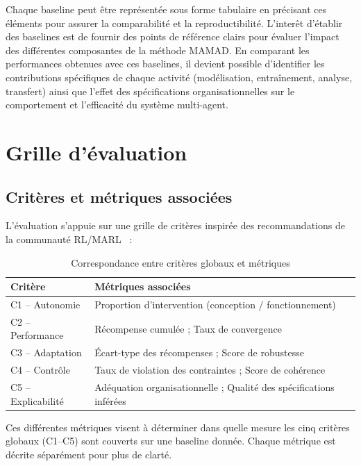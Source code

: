 Chaque baseline peut être représentée sous forme tabulaire en précisant ces éléments pour assurer la comparabilité et la reproductibilité. L'interêt d'établir des baselines est de fournir des points de référence clairs pour évaluer l'impact des différentes composantes de la méthode MAMAD. En comparant les performances obtenues avec ces baselines, il devient possible d'identifier les contributions spécifiques de chaque activité (modélisation, entraînement, analyse, transfert) ainsi que l'effet des spécifications organisationnelles sur le comportement et l'efficacité du système multi-agent.

\section{Grille d’évaluation}

\subsection{Critères et métriques associées}
L’évaluation s’appuie sur une grille de critères inspirée des recommandations de la communauté RL/MARL~\cite{papoudakis2021agent} :

\begin{table}[h!]
  \centering
  \caption{Correspondance entre critères globaux et métriques}
  \begin{tabular}{|l|l|}
    \hline
    \textbf{Critère}   & \textbf{Métriques associées}                                       \\
    \hline
    C1 – Autonomie     & Proportion d’intervention (conception / fonctionnement)            \\
    \hline
    C2 – Performance   & Récompense cumulée ; Taux de convergence                           \\
    \hline
    C3 – Adaptation    & Écart-type des récompenses ; Score de robustesse                   \\
    \hline
    C4 – Contrôle      & Taux de violation des contraintes ; Score de cohérence             \\
    \hline
    C5 – Explicabilité & Adéquation organisationnelle ; Qualité des spécifications inférées \\
    \hline
  \end{tabular}
  \label{tab:grille}
\end{table}

Ces différentes métriques visent à déterminer dans quelle mesure les cinq critères globaux (C1--C5) sont couverts sur une baseline donnée.
Chaque métrique est décrite séparément pour plus de clarté.

